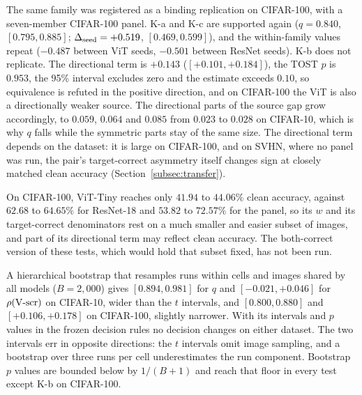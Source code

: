 The same family was registered as a binding replication on CIFAR-100, with a seven-member CIFAR-100 panel. K-a and K-c are supported again ($q = 0.840$, $[0.795, 0.885]$; $\Delta_{\mathrm{seed}} = +0.519$, $[0.469, 0.599]$), and the within-family values repeat ($-0.487$ between ViT seeds, $-0.501$ between ResNet seeds). K-b does not replicate. The directional term is $+0.143$ ($[+0.101, +0.184]$), the TOST $p$ is $0.953$, the 95\% interval excludes zero and the estimate exceeds $0.10$, so equivalence is refuted in the positive direction, and on CIFAR-100 the ViT is also a directionally weaker source. The directional parts of the source gap grow accordingly, to $0.059$, $0.064$ and $0.085$ from $0.023$ to $0.028$ on CIFAR-10, which is why $q$ falls while the symmetric parts stay of the same size. The directional term depends on the dataset: it is large on CIFAR-100, and on SVHN, where no panel was run, the pair's target-correct asymmetry itself changes sign at closely matched clean accuracy (Section~\ref{subsec:transfer}).

On CIFAR-100, ViT-Tiny reaches only $41.94$ to $44.06\%$ clean accuracy, against $62.68$ to $64.65\%$ for ResNet-18 and $53.82$ to $72.57\%$ for the panel, so its $w$ and its target-correct denominators rest on a much smaller and easier subset of images, and part of its directional term may reflect clean accuracy. The both-correct version of these tests, which would hold that subset fixed, has not been run.

A hierarchical bootstrap that resamples runs within cells and images shared by all models ($B = 2{,}000$) gives $[0.894, 0.981]$ for $q$ and $[-0.021, +0.046]$ for $\rho(\mbox{V-scr})$ on CIFAR-10, wider than the $t$ intervals, and $[0.800, 0.880]$ and $[+0.106, +0.178]$ on CIFAR-100, slightly narrower. With its intervals and $p$ values in the frozen decision rules no decision changes on either dataset. The two intervals err in opposite directions: the $t$ intervals omit image sampling, and a bootstrap over three runs per cell underestimates the run component. Bootstrap $p$ values are bounded below by $1/(B+1)$ and reach that floor in every test except K-b on CIFAR-100.

